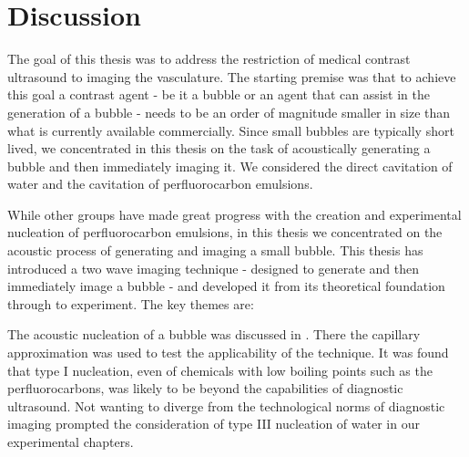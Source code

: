 

\chapter{Discussion}\label{ch:discussion}


The goal of this thesis was to address the restriction of medical contrast ultrasound to imaging the vasculature.
The starting premise was that to achieve this goal a contrast agent - be it a bubble or an agent that can assist in the generation of a bubble -
needs to be an order of magnitude smaller in size than what is currently available commercially.
Since small bubbles are typically short lived,
we concentrated in this thesis on the task of acoustically generating a bubble and then immediately imaging it.
We considered the direct cavitation of water and the cavitation of perfluorocarbon emulsions.

While other groups \cite{Rapoport2007,Fabiilli2010,Sheeran2013,Doinikov2014,Shpak2013,Lin2013} have made great progress with the creation and experimental nucleation of perfluorocarbon emulsions,
in this thesis we concentrated on the acoustic process of generating and imaging a small bubble. 
This thesis has introduced a two wave imaging technique 
- designed to generate and then immediately image a bubble -
and developed it from its theoretical foundation through to experiment.
The key themes are:

The acoustic nucleation of a bubble was discussed in .
There the capillary approximation was used to test the applicability of the technique.
It was found that type I nucleation, 
even of chemicals with low boiling points such as the perfluorocarbons,
was likely to be beyond the capabilities of diagnostic ultrasound.
Not wanting to diverge from the technological norms of diagnostic imaging 
prompted the consideration of type III nucleation of water in our experimental chapters.

